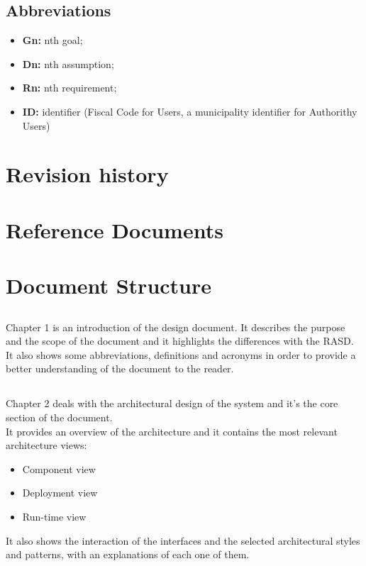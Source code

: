         \subsection{Abbreviations}
        \begin{itemize}            
            \item \textbf{Gn:} nth goal; 
            \item \textbf{Dn:} nth assumption;
            \item \textbf{Rn:} nth requirement; 
            \item \textbf{ID: } identifier (Fiscal Code for Users, a
            municipality identifier for Authorithy Users)
        \end{itemize}
        
    \section{Revision history}
    \section{Reference Documents}
    \newpage
    \section{Document Structure}
        \subsection*{}
        Chapter 1 is an introduction of the design document. It describes the
        purpose and the scope of the document and it highlights the differences
        with the RASD. \\It also shows some abbreviations, definitions and
        acronyms in order to provide a better understanding of the document to
        the reader.

        \subsection*{}
        Chapter 2 deals with the architectural design of the system and it's the
        core section of the document. \\
        It provides an overview of the architecture and it contains the most
        relevant architecture views:
        \begin{itemize}
            \item Component view
            \item Deployment view
            \item Run-time view
        \end{itemize}
        It also shows the interaction of the interfaces and the selected
        architectural styles and patterns, with an explanations of each one of
        them.
                
